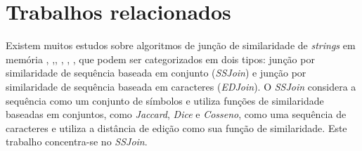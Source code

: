 \chapter{Trabalhos relacionados}
\label{cap:trab_rel}

Existem muitos estudos sobre algoritmos de junção de similaridade de \textit{strings} em memória \cite{Gravano:2001:ASJ:645927.672200}, \cite{Sarawagi:2004:ESJ:1007568.1007652},\cite{Chaudhuri:2006:POS:1129754.1129865}, \cite{Arasu:2006:EES:1182635.1164206}, \cite{Bayardo:2007:SUP:1242572.1242591}, \cite{Xiao:2008:ESJ:1367497.1367516}, que podem ser categorizados em dois tipos: junção por similaridade de sequência baseada em conjunto (\textit{SSJoin}) e junção por similaridade de sequência baseada em caracteres (\textit{EDJoin}).  O \textit{SSJoin} considera a sequência como um conjunto de símbolos e utiliza funções de similaridade baseadas em conjuntos, como \textit{Jaccard}, \textit{Dice} e \textit{Cosseno}, como uma sequência de caracteres e utiliza a distância de edição como sua função de similaridade. Este trabalho concentra-se no \textit{SSJoin}.

